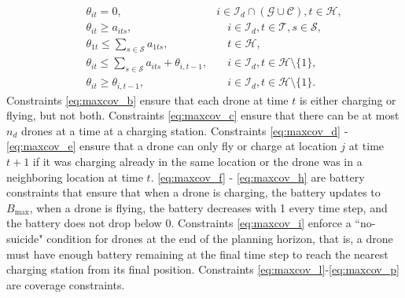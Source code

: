 \documentclass{article}
\newcommand{\set}[1]{\mathcal{#1}}
\begin{document}
\begin{subequations}
\begin{align}
        &\quad \displaystyle \theta_{it} = 0, & i \in \set I_d \cap (\set G \cup \set C), t \in \set H, \label{eq:maxcov_l} \\
        &\quad \displaystyle \theta_{it} \geq a_{its}, &\quad i \in \set I_d, t \in \set T, s \in \set S, \label{eq:maxcov_m} \\
        &\quad \displaystyle \theta_{1t} \leq \sum_{s \in \set S} a_{1ts}, &\quad t \in \set H, \label{eq:maxcov_n} \\
        &\quad \displaystyle \theta_{it} \leq \sum_{s \in \set S} a_{its} + \theta_{i,t-1}, &\quad i \in \set I_d, t \in \set H \setminus \{1\}, \label{eq:maxcov_o} \\
        &\quad \displaystyle \theta_{it} \geq \theta_{i,t-1}, &\quad i \in \set I_d, t \in \set H \setminus \{1\}. \label{eq:maxcov_p}
    \end{align}
\end{subequations}
Constraints \eqref{eq:maxcov_b} ensure that each drone at time $t$ is either charging or flying, but not both. 
Constraints \eqref{eq:maxcov_c} ensure that there can be at most $n_d$ drones at a time at a charging station.
Constraints \eqref{eq:maxcov_d} - \eqref{eq:maxcov_e} ensure that a drone can only fly or charge at location $j$ at time $t+1$ if it was charging already in the same location or the drone was in a neighboring location at time $t$.
\eqref{eq:maxcov_f}  - \eqref{eq:maxcov_h} are battery constraints that ensure that when a drone is charging, the battery updates to $B_{\text{max}}$, when a drone is flying, the battery decreases with 1 every time step, and the battery does not drop below $0$. Constraints \eqref{eq:maxcov_i} enforce a ``no-suicide" condition for drones at the end of the planning horizon, that is, a drone must have enough battery remaining at the final time step to reach the nearest charging station from its final position. Constraints \eqref{eq:maxcov_l}-\eqref{eq:maxcov_p} are coverage constraints. 
\end{document}
